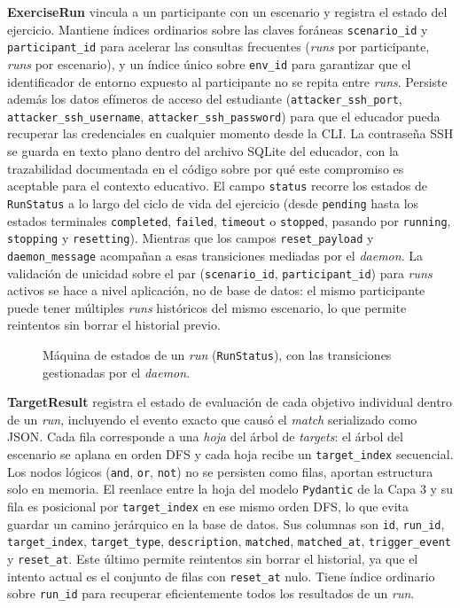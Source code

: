 \textbf{ExerciseRun} vincula a un participante con un escenario y registra el
estado del ejercicio. Mantiene índices ordinarios sobre las claves foráneas
\texttt{scenario\_id} y \texttt{participant\_id} para acelerar las consultas
frecuentes (\textit{runs} por participante, \textit{runs} por escenario), y un
índice único sobre \texttt{env\_id} para garantizar que el identificador de
entorno expuesto al participante no se repita entre \textit{runs}. Persiste
además los datos efímeros de
acceso del estudiante (\texttt{attacker\_ssh\_port},
\texttt{attacker\_ssh\_username}, \texttt{attacker\_ssh\_password}) para que el
educador pueda recuperar las credenciales en cualquier momento desde la CLI. La
contraseña SSH se guarda en texto plano dentro del archivo SQLite del educador,
con la trazabilidad documentada en el código sobre por qué este compromiso es
aceptable para el contexto educativo. El campo \texttt{status} recorre los
estados de \texttt{RunStatus} a lo largo del ciclo de vida del ejercicio (desde
\texttt{pending} hasta los estados terminales \texttt{completed},
\texttt{failed}, \texttt{timeout} o \texttt{stopped}, pasando por
\texttt{running}, \texttt{stopping} y \texttt{resetting}). Mientras que los
campos \texttt{reset\_payload} y \texttt{daemon\_message} acompañan a esas
transiciones mediadas por el \textit{daemon}. La validación de unicidad sobre el par
(\texttt{scenario\_id}, \texttt{participant\_id}) para \textit{runs} activos se
hace a nivel aplicación, no de base de datos: el mismo participante puede tener
múltiples \textit{runs} históricos del mismo escenario, lo que permite
reintentos sin
borrar el historial previo.

\begin{figure}[H]
    \centering
    \resizebox{0.7\textwidth}{!}{}
    \caption{Máquina de estados de un \textit{run} (\texttt{RunStatus}), con las
    transiciones gestionadas por el \textit{daemon}.}
    \label{fig:run-estados}
\end{figure}

\textbf{TargetResult} registra el estado de evaluación de cada objetivo
individual dentro de un \textit{run}, incluyendo el evento exacto que causó el
\textit{match} serializado como JSON. Cada fila corresponde a una \emph{hoja}
del árbol de \textit{targets}: el árbol del escenario se aplana en orden DFS y
cada hoja recibe un \texttt{target\_index} secuencial. Los nodos lógicos
(\texttt{and}, \texttt{or}, \texttt{not}) no se persisten como filas, aportan
estructura solo en memoria. El reenlace entre la hoja del modelo
\texttt{Pydantic} de la Capa 3 y su fila es posicional por
\texttt{target\_index} en ese mismo orden DFS, lo que evita
guardar un camino jerárquico en la base de datos. Sus columnas son \texttt{id},
\texttt{run\_id}, \texttt{target\_index}, \texttt{target\_type},
\texttt{description}, \texttt{matched}, \texttt{matched\_at},
\texttt{trigger\_event} y \texttt{reset\_at}. Este último permite reintentos sin
borrar el historial, ya que el intento actual es el conjunto de filas con
\texttt{reset\_at} nulo. Tiene índice ordinario sobre \texttt{run\_id} para
recuperar eficientemente todos los resultados de un \textit{run}.

